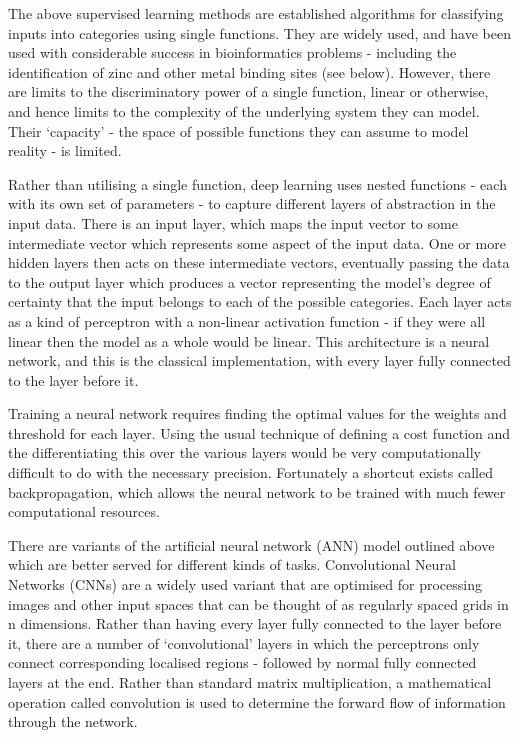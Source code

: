 The above supervised learning methods are established algorithms for classifying inputs into categories using single functions. They are widely used, and have been used with considerable success in bioinformatics problems - including the identification of zinc and other metal binding sites (see below). However, there are limits to the discriminatory power of a single function, linear or otherwise, and hence limits to the complexity of the underlying system they can model. Their `capacity' - the space of possible functions they can assume to model reality - is limited.

Rather than utilising a single function, deep learning uses nested functions - each with its own set of parameters - to capture different layers of abstraction in the input data. There is an input layer, which maps the input vector to some intermediate vector which represents some aspect of the input data. One or more hidden layers then acts on these intermediate vectors, eventually passing the data to the output layer which produces a vector representing the model's degree of certainty that the input belongs to each of the possible categories. Each layer acts as a kind of perceptron with a non-linear activation function - if they were all linear then the model as a whole would be linear. This architecture is a neural network, and this is the classical implementation, with every layer fully connected to the layer before it.

Training a neural network requires finding the optimal values for the weights and threshold for each layer. Using the usual technique of defining a cost function and the differentiating this over the various layers would be very computationally difficult to do with the necessary precision. Fortunately a shortcut exists called backpropagation, which allows the neural network to be trained with much fewer computational resources.

There are variants of the artificial neural network (ANN) model outlined above which are better served for different kinds of tasks. Convolutional Neural Networks (CNNs) are a widely used variant that are optimised for processing images and other input spaces that can be thought of as regularly spaced grids in n dimensions. Rather than having every layer fully connected to the layer before it, there are a number of `convolutional' layers in which the perceptrons only connect corresponding localised regions - followed by normal fully connected layers at the end. Rather than standard matrix multiplication, a mathematical operation called convolution is used to determine the forward flow of information through the network.


